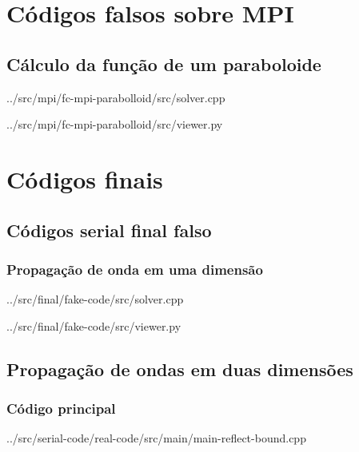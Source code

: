\chapter{Códigos falsos sobre MPI}
\section{Cálculo da função de um paraboloide}
     
     {../src/mpi/fc-mpi-parabolloid/src/solver.cpp}
     
     
     {../src/mpi/fc-mpi-parabolloid/src/viewer.py}

\chapter{Códigos finais}
\section{Códigos serial final falso}
    \subsection{Propagação de onda em uma dimensão}
         
         {../src/final/fake-code/src/solver.cpp}
         
         
         {../src/final/fake-code/src/viewer.py}
    
\section{Propagação de ondas em duas dimensões}
    \subsection{Código principal}
         
         {../src/serial-code/real-code/src/main/main-reflect-bound.cpp}

